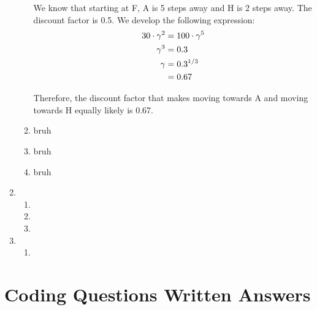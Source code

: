 \documentclass[12pt]{article}
\begin{document}
\begin{enumerate}
\begin{enumerate}
      We know that starting at F, A is 5 steps away and H is 2 steps away. The discount factor is 0.5. We develop the following expression: \\
      \begin{align*}
        30 \cdot \gamma^2 &= 100 \cdot \gamma^5 \notag \\ 
        \gamma^3 &= 0.3 \notag \\ 
        \gamma &= 0.3^{1/3} \notag \\ 
        &= 0.67 \notag 
      \end{align*}

      Therefore, the discount factor that makes moving towards A and moving towards H equally likely is 0.67.
      \item bruh 
      \item bruh 
      \item bruh 
    \end{enumerate}
  \item 
  \begin{enumerate}
    \item
    \item
    \item
    \end{enumerate}  
  \item 
  \begin{enumerate}
    \item
  \end{enumerate}  
\end{enumerate}

\section{Coding Questions Written Answers}
\end{document}
